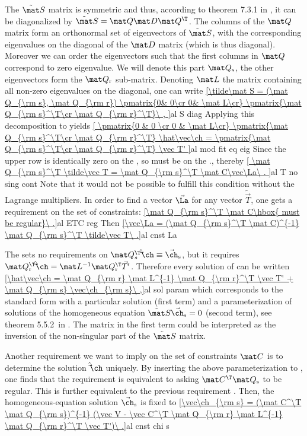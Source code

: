 The $\tilde\mat S$ matrix is symmetric and thus, according to theorem 7.3.1 in , it can be diagonalized by $\tilde\mat S = \mat Q \mat D \mat Q^\T$. The columns of the $\mat Q$ matrix form an orthonormal set of eigenvectors of $\tilde\mat S$, with the corresponding eigenvalues on the diagonal of the $\mat D$ matrix (which is thus diagonal). Moreover we can order the eigenvectors such that the first columns in $\mat Q$ correspond to zero eigenvalue. We will denote this part $\mat Q_{\rm s}$, the other eigenvectors form the $\mat Q_{\rm r}$ sub-matrix. Denoting $\mat L$ the matrix containing all non-zero eigenvalues on the diagonal, one can write
\eqref{\tilde\mat S = (\mat Q_{\rm s}, \mat Q_{\rm r})
	\pmatrix{0& 0\cr 0& \mat L\cr}
	\pmatrix{\mat Q_{\rm s}^\T\cr \mat Q_{\rm r}^\T}\ ,
}{al S diag}
Applying this decomposition to  yields
\eqref{
	\pmatrix{0 & 0 \cr 0 & \mat L\cr} \pmatrix{\mat Q_{\rm s}^\T\cr \mat Q_{\rm r}^\T} \hat\vec\ch
	= \pmatrix{\mat Q_{\rm s}^\T\cr \mat Q_{\rm r}^\T} \vec T'
}{al mod fit eq eig}
Since the upper row is identically zero on the \lhs, so must be on the \rhs., thereby
\eqref{
	\mat Q_{\rm s}^\T \tilde\vec T = \mat Q_{\rm s}^\T \mat C\vec\La\ .
}{al T no sing cont}
Note that it would not be possible to fulfill this condition without the Lagrange multipliers. In order to find a vector $\vec\La$ for any vector $\tilde\vec T$, one gets a requirement on the set of constraints:
\eqref{\mat Q_{\rm s}^\T \mat C\hbox{ must be regular}\ .}{al ETC reg}
Then
\eqref{\vec\La = (\mat Q_{\rm s}^\T \mat C)^{-1} \mat Q_{\rm s}^\T \tilde\vec T\ .}{al cnst La}

The  sets no requirements on $\mat Q_{s}^\T \hat\vec\ch \equiv \vec\ch_{\rm s}$, but it requires $\mat Q_{\rm r}^\T \hat\vec\ch = \mat L^{-1} \mat Q_{\rm r}^\T \vec T'$. Therefore every solution of  can be written
\eqref{\hat\vec\ch =  \mat Q_{\rm r} \mat L^{-1} \mat Q_{\rm r}^\T \vec T' + \mat Q_{\rm s} \vec\ch_{\rm s}\ ,}{al sol param}
which corresponds to the standard form with a particular solution (first term) and a parameterization of solutions of the homogeneous equation $\tilde\mat S \vec\ch_{\rm s} = 0$ (second term), see theorem 5.5.2~in . The matrix in the first term could be interpreted as the inversion of the non-singular part of the $\tilde\mat S$ matrix.

Another requirement we want to imply on the set of constraints $\mat C$ is to determine the solution $\hat\vec\ch$ uniquely. By inserting the above parameterization to , one finds that the requirement is equivalent to asking $\mat C^\T \mat Q_{\rm s}$ to be regular. This is further equivalent to the previous requirement . Then, the homogeneous-equation solution $\vec\ch_{\rm s}$ is fixed to
\eqref{\vec\ch_{\rm s} = (\mat C^\T \mat Q_{\rm s})^{-1} (\vec V - \vec C^\T \mat Q_{\rm r} \mat L^{-1} \mat Q_{\rm r}^\T \vec T')\ .}{al cnst chi s}

